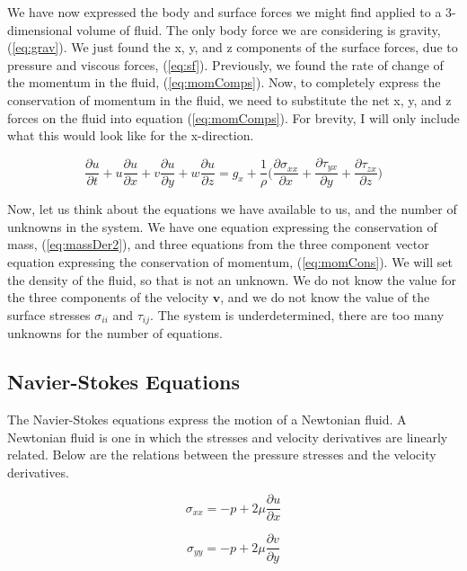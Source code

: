 \documentclass[twocolumn,12pth]{article}
\begin{document}
We have now expressed the body and surface forces we might find applied to a 3-dimensional volume of fluid. 
The only body force we are considering is gravity, (\ref{eq:grav}).
We just found the x, y, and z components of the surface forces, due to pressure and viscous forces, (\ref{eq:sf}).
Previously, we found the rate of change of the momentum in the fluid, (\ref{eq:momComps}).
Now, to completely express the conservation of momentum in the fluid, we need to substitute the net x, y, and z forces on the fluid into equation (\ref{eq:momComps}).
For brevity, I will only include what this would look like for the x-direction.

\begin{equation}
\frac{\partial{u}}{\partial{t}} + u\frac{\partial{u}}{\partial{x}} + v\frac{\partial{u}}{\partial{y}} + w\frac{\partial{u}}{\partial{z}} = g_x + \frac{1}{\rho} \bigg(\frac{\partial{\sigma_{xx}}}{\partial{x}} + \frac{\partial{\tau_{yx}}}{\partial{y}} + \frac{\partial{\tau_{zx}}}{\partial{z}} \bigg)
\label{eq:momCons}
\end{equation}

Now, let us think about the equations we have available to us, and the number of unknowns in the system.
We have one equation expressing the conservation of mass, (\ref{eq:massDer2}), and three equations from the three component vector equation expressing the conservation of momentum, (\ref{eq:momCons}).
We will set the density of the fluid, so that is not an unknown.
We do not know the value for the three components of the velocity $\mathbf{v}$, and we do not know the value of the surface stresses $\sigma_{ii}$ and $\tau_{ij}$.
The system is underdetermined, there are too many unknowns for the number of equations.


\subsection{Navier-Stokes Equations}

The Navier-Stokes equations express the motion of a Newtonian fluid.
A Newtonian fluid is one in which the stresses and velocity derivatives are linearly related.
Below are the relations between the pressure stresses and the velocity derivatives.

\begin{equation}
\sigma_{xx} = -p + 2\mu\frac{\partial{u}}{\partial{x}}
\label{eq:norms}
\end{equation}

\begin{equation*}
\sigma_{yy} = -p + 2\mu\frac{\partial{v}}{\partial{y}}
\end{equation*}
\end{document}
